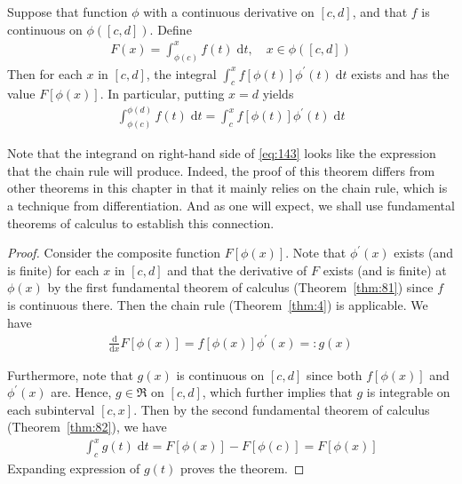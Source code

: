 \documentclass[thmcnt=section, 12pt]{my-elegantbook}
\begin{document}

\begin{theorem} \label{thm:83}
    Suppose that function $\phi$
    with a continuous derivative on $[c, d]$,
    and that $f$ is continuous on $\phi([c, d])$.
    Define
    \begin{align*}
        F(x) = \int_{\phi(c)}^x f(t) \; \mathrm{d} t,
        \quad x \in \phi([c, d])
    \end{align*}
    Then for each $x$ in $[c, d]$, the integral
    $\int_{c}^x f[\phi(t)] \phi^\prime(t) \; \mathrm{d} t$
    exists and has the value $F[ \phi(x) ]$.
    In particular, putting $x = d$ yields
    \begin{align}
        \int_{\phi(c)}^{\phi(d)} f(t) \; \mathrm{d} t
        = \int_{c}^x f[\phi(t)] \phi^\prime(t) \; \mathrm{d} t
        \label{eq:143}
    \end{align}
\end{theorem}

Note that the integrand on right-hand side of \eqref{eq:143}
looks like the expression that the chain rule will produce.
Indeed, the proof of this theorem
differs from other theorems in this chapter in that
it mainly relies on the chain rule,
which is a technique from differentiation.
And as one will expect,
we shall use fundamental theorems of calculus
to establish this connection.

\begin{proof}
    Consider the composite function $F[\phi(x)]$.
    Note that $\phi^\prime(x)$ exists (and is finite)
    for each $x$ in $[c,d]$
    and that the derivative of $F$ exists (and is finite)
    at $\phi(x)$
    by the first fundamental theorem of calculus (Theorem~\ref{thm:81})
    since $f$ is continuous there.
    Then the chain rule (Theorem~\ref{thm:4}) is applicable.
    We have
    \begin{align*}
        \frac{ \mathrm{d} }{ \mathrm{d} x } F[\phi(x)]
        = f[ \phi(x) ] \phi^\prime(x)
        =: g(x)
    \end{align*}

    Furthermore, note that $g(x)$ is continuous on $[c, d]$
    since both $f[\phi(x)]$ and $\phi^\prime(x)$ are.
    Hence, $g \in \mathfrak{R}$ on $[c, d]$,
    which further implies that $g$ is integrable
    on each subinterval $[c, x]$.
    Then by the second fundamental theorem of calculus
    (Theorem~\ref{thm:82}),
    we have
    \begin{align*}
        \int_c^x g(t) \; \mathrm{d} t
        = F[\phi(x)] - F[\phi(c)]
        = F[\phi(x)]
    \end{align*}
    Expanding expression of $g(t)$ proves the theorem.
\end{proof}
\end{document}
